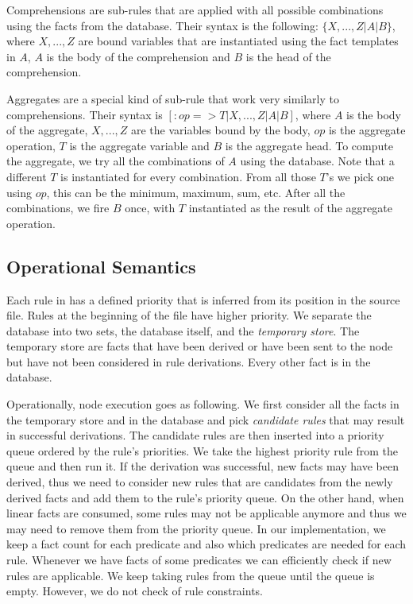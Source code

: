 Comprehensions are sub-rules that are applied with all possible combinations using the facts from the database. Their syntax is the following: $\{X, ..., Z | A | B\}$, where $X, ..., Z$ are bound variables that are instantiated using the fact templates in $A$, $A$ is the body of the comprehension and $B$ is the head of the comprehension.

Aggregates are a special kind of sub-rule that work very similarly to comprehensions. Their syntax is $[:op => T | X, ..., Z | A | B]$, where $A$ is the body of the aggregate, $X, ..., Z$ are the variables bound by the body, $op$ is the aggregate operation, $T$ is the aggregate variable and $B$ is the aggregate head. To compute the aggregate, we try all the combinations of $A$ using the database. Note that a different $T$ is instantiated for every combination. From all those $T$'s we pick one using $op$, this can be the minimum, maximum, sum, etc. After all the combinations, we fire $B$ once, with $T$ instantiated as the result of the aggregate operation.

\subsection{Operational Semantics}

Each rule in \lang has a defined priority that is inferred from its position in the source file. Rules at the beginning of the file have higher priority. We separate the database into two sets,
the database itself, and the \emph{temporary store}. The temporary store are facts that have been
derived or have been sent to the node but have not been considered in rule derivations. Every other fact is in the database.

Operationally, node execution goes as following. We first consider all the facts in the
temporary store and in the database and pick \emph{candidate rules} that may result in
successful derivations. The candidate rules are then inserted into a priority queue ordered
by the rule's priorities. We take the highest priority rule from the queue and then run it.
If the derivation was successful, new facts may have been derived, thus we need to consider new
rules that are candidates from the newly derived facts and add them to the rule's priority queue.
On the other hand, when linear facts are consumed, some rules may not be applicable anymore and thus
we may need to remove them from the priority queue. In our implementation,
we keep a fact count for each predicate and also which predicates are needed for each rule. Whenever we have facts of some
predicates we can efficiently check if new rules are applicable. We keep taking rules from the
queue until the queue is empty. However, we do not check of rule constraints.

